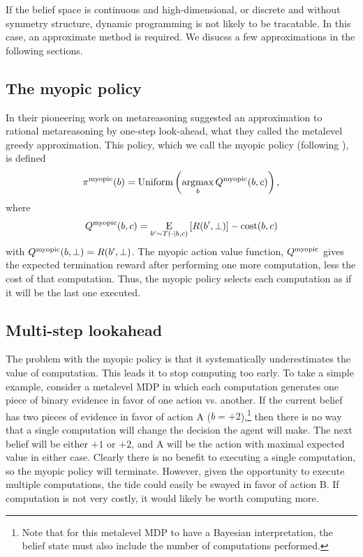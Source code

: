 If the belief space is continuous and high-dimensional, or discrete and without symmetry structure, dynamic programming is not likely to be tracatable. In this case, an approximate method is required. We disucss a few approximations in the following sections.

\subsection{The myopic policy}

In their pioneering work on metareasoning \citet{russell1991principles} suggested an approximation to rational metareasoning by one-step look-ahead, what they called the metalevel greedy approximation. This policy, which we call the myopic policy (following \citealp{hay2012selecting}), is defined
\begin{equation}
  \pi^{\mathrm{myopic}}(b) = \text{Uniform}\left(\operatorname*{argmax}_b Q^{\mathrm{myopic}}(b, c)\right),
\end{equation}
where
\begin{equation}
Q^{\mathrm{myopic}}(b, c) = \operatorname*{E}_{b' \sim T(\cdot \mid b, c)}\left[ 
  R(b', \bot)
\right] - \text{cost}(b, c)
\end{equation}
with $Q^{\mathrm{myopic}}(b, \bot) = R(b', \bot)$. The myopic action value function, $Q^{\mathrm{myopic}}$ gives the expected termination reward after performing one more computation, less the cost of that computation. Thus, the myopic policy selects each computation as if it will be the last one executed.

\subsection{Multi-step lookahead}

The problem with the myopic policy is that it systematically underestimates the value of computation. This leads it to stop computing too early. To take a simple example, consider a metalevel MDP in which each computation generates one piece of binary evidence in favor of one action vs. another. If the current belief has two pieces of evidence in favor of action A ($b = +2$),\footnote{Note that for this metalevel MDP to have a Bayesian interpretation, the belief state must also include the number of computations performed.} then there is no way that a single computation will change the decision the agent will make. The next belief will be either $+1$ or $+2$, and A will be the action with maximal expected value in either case. Clearly there is no benefit to executing a single computation, so the myopic policy will terminate. However, given the opportunity to execute multiple computations, the tide could easily be swayed in favor of action B. If computation is not very costly, it would likely be worth computing more.

